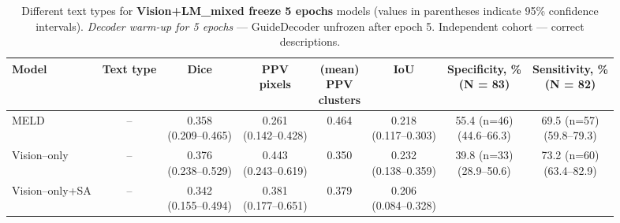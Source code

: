 \documentclass[FCD_GNN.tex]{subfiles}
\begin{document}
    \begin{table}[ht]
    \centering
    \tiny
    \caption{Different text types for \textbf{Vision+LM\_mixed freeze 5 epochs} models (values in parentheses indicate 95\% confidence intervals). \emph{Decoder warm-up for 5 epochs} — GuideDecoder unfrozen after epoch 5. Independent cohort — correct descriptions.}
    
    \label{tab:main_cohort_mixed}
    \begin{tabular}{lccccccc}
    \textbf{Model} &
    \textbf{Text type} &
    \textbf{Dice} &
    \makecell{\textbf{PPV}\\\textbf{pixels}} &
    \makecell{\textbf{(mean)} \\\textbf{PPV} \\\textbf{clusters}} & 
    \textbf{IoU} & 
    \makecell{\textbf{Specificity, \%} \\ (N = 83)}&
    \makecell{\textbf{Sensitivity, \%} \\ (N = 82)}\\
    \hline
    MELD & -- &
    \makecell{0.358\\(0.209--0.465)} &
    \makecell{0.261\\(0.142--0.428)} &
    0.464 &
    \makecell{0.218\\(0.117--0.303)} &
    \makecell{55.4 (n=46) \\ (44.6--66.3)} & 
    \makecell{69.5 (n=57) \\ (59.8--79.3)} \\
    \hline
    Vision--only & -- &
    \makecell{\colorbox{cyan!15}{0.376}\\(0.238--0.529)} &
    \makecell{\colorbox{cyan!15}{0.443}\\(0.243--0.619)} &
    0.350 &
    \makecell{\colorbox{cyan!15}{0.232}\\(0.138--0.359)} &
    \makecell{39.8 (n=33) \\ (28.9--50.6)} &
    \makecell{73.2 (n=60) \\ (63.4--82.9)} \\
    \hline
    Vision--only+SA & -- &
    \makecell{0.342\\ (0.155--0.494)} &
    \makecell{0.381\\ (0.177--0.651)} &
    0.379 &
    \makecell{0.206\\ (0.084--0.328)} &

\end{tabular}
\end{table}
\end{document}
